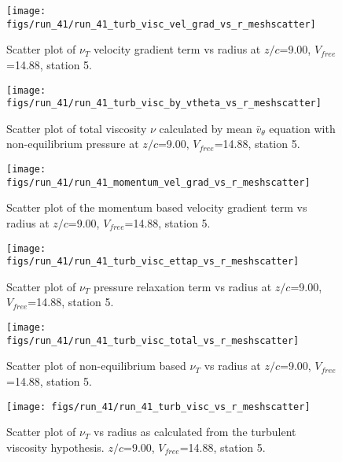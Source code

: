 \begin{figure}[H]
\centering
\texttt{[image: figs/run\_41/run\_41\_turb\_visc\_vel\_grad\_vs\_r\_meshscatter]}
\caption{Scatter plot of $\nu_T$ velocity gradient term vs radius at $z/c$=9.00, $V_{free}$=14.88, station 5.}
\end{figure}


\begin{figure}[H]
\centering
\texttt{[image: figs/run\_41/run\_41\_turb\_visc\_by\_vtheta\_vs\_r\_meshscatter]}
\caption{Scatter plot of total viscosity $\nu$ calculated by mean $\bar{v}_{\theta}$ equation with non-equilibrium pressure at $z/c$=9.00, $V_{free}$=14.88, station 5.}
\end{figure}


\begin{figure}[H]
\centering
\texttt{[image: figs/run\_41/run\_41\_momentum\_vel\_grad\_vs\_r\_meshscatter]}
\caption{Scatter plot of the momentum based velocity gradient term vs radius at $z/c$=9.00, $V_{free}$=14.88, station 5.}
\end{figure}


\begin{figure}[H]
\centering
\texttt{[image: figs/run\_41/run\_41\_turb\_visc\_ettap\_vs\_r\_meshscatter]}
\caption{Scatter plot of $\nu_T$ pressure relaxation term vs radius at $z/c$=9.00, $V_{free}$=14.88, station 5.}
\end{figure}


\begin{figure}[H]
\centering
\texttt{[image: figs/run\_41/run\_41\_turb\_visc\_total\_vs\_r\_meshscatter]}
\caption{Scatter plot of non-equilibrium based $\nu_T$ vs radius at $z/c$=9.00, $V_{free}$=14.88, station 5.}
\end{figure}


\begin{figure}[H]
\centering
\texttt{[image: figs/run\_41/run\_41\_turb\_visc\_vs\_r\_meshscatter]}
\caption{Scatter plot of $\nu_T$ vs radius as calculated from the turbulent viscosity hypothesis. $z/c$=9.00, $V_{free}$=14.88, station 5.}
\end{figure}


